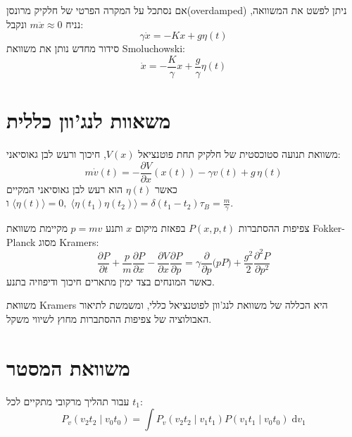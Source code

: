\documentclass{tstextbook}
\begin{document}
אם נסתכל על המקרה הפרטי של חלקיק מרונסן(overdamped) ניתן לפשט את המשוואה, נניח \(m\ddot{x} \approx 0\) ונקבל:
$$ \gamma\dot{x} = -Kx + g\eta(t) $$
סידור מחדש נותן את משוואת Smoluchowski:
$$ \dot{x} = -\frac{K}{\gamma}x + \frac{g}{\gamma}\eta(t) $$

\section{משאוות לנג'וון כללית}

\begin{proposition}
משוואת תנועה סטוכסטית של חלקיק תחת פוטנציאל \(V(x)\), חיכוך ורעש לבן גאוסיאני:
$$m\dot v(t) = -\frac{\partial V}{\partial x}(x(t)) - \gamma v(t) + g\,\eta(t)
$$
כאשר \(\eta(t)\) הוא רעש לבן גאוסיאני המקיים \(\langle \eta(t)\rangle=0,\;\langle \eta(t_1)\eta(t_2)\rangle=\delta(t_1-t_2)\) ו\(\tau_B = \tfrac{m}{\gamma}\).

\end{proposition}
\begin{proposition}
צפיפות ההסתברות \(P(x,p,t)\) בפאזת מיקום \(x\) ותנע \(p=m v\) מקיימת משוואת Fokker-Planck מסוג Kramers:
$$\frac{\partial P}{\partial t} + \frac{p}{m}\frac{\partial P}{\partial x} - \frac{\partial V}{\partial x}\frac{\partial P}{\partial p}= \gamma \frac{\partial}{\partial p}\bigl(p P\bigr) + \frac{g^{2}}{2}\frac{\partial^{2}P}{\partial p^{2}}
$$
כאשר המונחים בצד ימין מתארים חיכוך ודיפוזיה בתנע.

\end{proposition}
\begin{remark}
משוואת Kramers היא הכללה של משוואת לנג'וון לפוטנציאל כללי, ומשמשת לתיאור האבולוציה של צפיפות ההסתברות מחוץ לשיווי משקל.

\end{remark}
\section{משוואת המסטר}

עבור תהליך מרקובי מתקיים לכל \(t_{1}\):
$$P_{v}(v_{2}t_{2}\mid  v_{0}t_{0})= \int P_{v}(v_{2}t_{2}\mid v_{1}t_{1})P(v_{1}t_{1}\mid v_{0}t_{0})\;\mathrm{d}v_{1}$$
\end{document}
